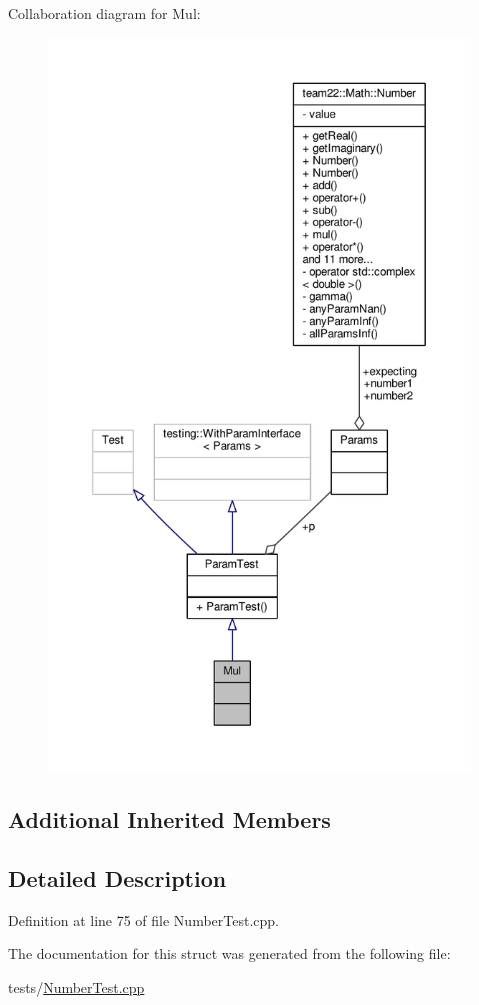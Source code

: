 Collaboration diagram for Mul\+:
\nopagebreak
\begin{figure}[H]
\begin{center}
\leavevmode
\includegraphics[height=550pt]{struct_mul__coll__graph}
\end{center}
\end{figure}
\subsection*{Additional Inherited Members}


\subsection{Detailed Description}


Definition at line 75 of file Number\+Test.\+cpp.



The documentation for this struct was generated from the following file\+:\begin{DoxyCompactItemize}
\item 
tests/\hyperlink{_number_test_8cpp}{Number\+Test.\+cpp}\end{DoxyCompactItemize}
